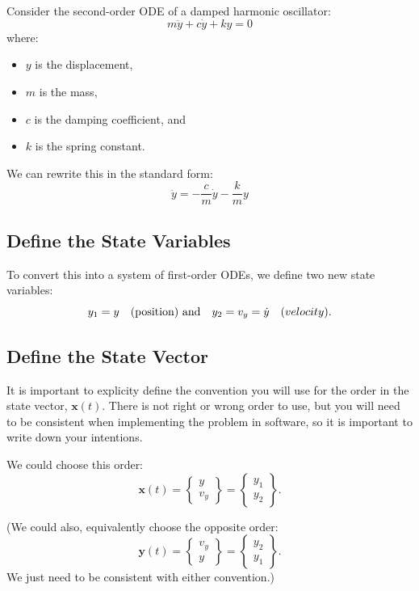 \documentclass{article}
\begin{document}
Consider the second-order ODE of a damped harmonic oscillator:
\[
m \ddot{y} + c \dot{y} + k y = 0
\]
where:
\begin{itemize}
    \item \( y \) is the displacement,
    \item \( m \) is the mass,
    \item \( c \) is the damping coefficient, and
    \item \( k \) is the spring constant.
\end{itemize}

We can rewrite this in the standard form:
\[
\ddot{y} = -\frac{c}{m} \dot{y} - \frac{k}{m} y
\]

\subsection{Define the State Variables}

To convert this into a system of first-order ODEs, we define two new state variables:
\[
y_1 = y \quad \text{(position) and} \quad y_2 = v_y =  \dot{y} \quad \text(velocity).
\]

\subsection{Define the State Vector}

It is important to explicity define the convention you will use for the order in the state vector, $\mathbf{x}(t)$.  There is not right or wrong order to use, but you will need to be consistent when implementing the problem in software, so it is important to write down your intentions.

We could choose this order:
\[
\mathbf{x}(t) =
\begin{Bmatrix} y \\ v_y \end{Bmatrix} =
\begin{Bmatrix} y_1 \\ y_2 \end{Bmatrix}.
\]

(We could also, equivalently choose the opposite order:
\[
\mathbf{y}(t) =
\begin{Bmatrix}  v_y \\ y \end{Bmatrix} =
\begin{Bmatrix} y_2 \\ y_1 \end{Bmatrix}.
\]
We just need to be consistent with either convention.)
\end{document}
